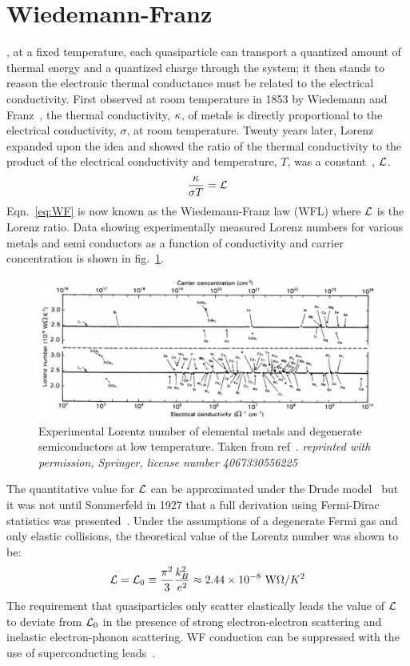 \section{Wiedemann-Franz}
, at a fixed temperature, each quasiparticle can transport a quantized amount of thermal energy and a quantized charge through the system; it then stands to reason the electronic thermal conductance must be related to the electrical conductivity. First observed at room temperature in 1853 by Wiedemann and Franz~\cite{franz_ueber_1853},  the thermal conductivity, $\mathrm{\kappa}$, of metals is directly proportional to the electrical conductivity, $\sigma$, at room temperature. Twenty years later, Lorenz expanded upon the idea and showed the ratio of the thermal conductivity to the product of the electrical conductivity and temperature, $T$, was a constant~\cite{lorenz_bestimmung_1872}, $\mathcal{L}$.
\begin{equation}\label{eq:WF}
\frac{\mathrm{\kappa}}{\sigma T} = \mathcal{L}
\end{equation}
Eqn.~\ref{eq:WF} is now known as the Wiedemann-Franz law (WFL) where $\mathcal{L}$ is the Lorenz ratio. Data showing experimentally measured Lorenz numbers for various metals and semi conductors as a function of conductivity and carrier concentration is shown in fig.~\ref{fig:WF_in_metals}.
\begin{figure}
\centering
\includegraphics[width=\textwidth]{figures/electronic_cooling/WF_in_metals.png}
\caption{Experimental Lorentz number of elemental metals and degenerate semiconductors at low temperature. Taken from ref~\cite{kumar_experimental_1993}. \textit{reprinted with permission, Springer, license number 4067330556225}}
\label{fig:WF_in_metals}
\end{figure}
The quantitative value for $\mathcal{L}$ can be approximated under the Drude model~\cite{ashcroft_solid_1976} but it was not until Sommerfeld in 1927 that a full derivation using Fermi-Dirac statistics was presented~\cite{sommerfeld}. Under the assumptions of a degenerate Fermi gas and only elastic collisions, the theoretical value of the Lorentz number was shown to be:
\begin{equation}
\mathcal{L} = \mathcal{L}_0 \equiv \frac{\pi^2}{3}\frac{k_B^2}{e^2} \approx 2.44\times10^{-8}~\mathrm{W}\Omega/K^2
\end{equation}
The requirement that quasiparticles only scatter elastically leads the value of $\mathcal{L}$ to deviate from $\mathcal{L}_0$ in the presence of strong electron-electron scattering and inelastic electron-phonon scattering. WF conduction can be suppressed with the use of superconducting leads~\cite{mckitterick_prospects_2015}.

